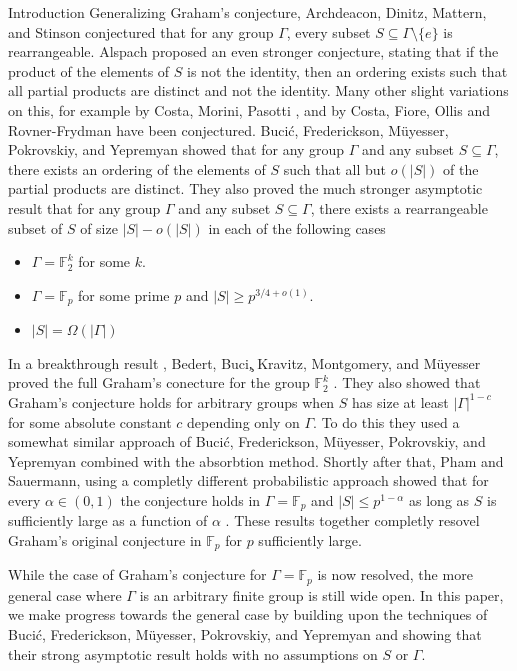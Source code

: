 \documentclass[11pt,a4paper]{article}
\begin{document}
\begin{section}{Introduction}
Generalizing Graham's conjecture, Archdeacon, Dinitz, Mattern, and Stinson \cite{ADMS} conjectured that for any group $\Gamma$, every subset $S \subseteq \Gamma \setminus \{e \}$ is rearrangeable. Alspach \cite{Al} proposed an even stronger conjecture, stating that if the product of the elements of $S$ is not the identity, then an ordering exists such that all partial products are distinct and not the identity. Many other slight variations on this, for example by Costa, Morini, Pasotti \cite{CMPP}, and by Costa, Fiore, Ollis and Rovner-Frydman \cite{CDFO} have been conjectured. Buci\'c, Frederickson, M\"uyesser, Pokrovskiy, and Yepremyan \cite{BFMPY} showed that for any group $\Gamma$ and any subset $S \subseteq \Gamma$, there exists an ordering of the elements of $S$ such that all but $o(|S|)$ of the partial products are distinct. They also proved the much stronger asymptotic result that for any group $\Gamma$ and any subset $S \subseteq \Gamma$, there exists a rearrangeable subset of $S$ of size $|S| - o(|S|)$ in each of the following cases
\begin{itemize}
\item $\Gamma = \mathbb F_2^k$ for some $k$.
\item $\Gamma = \mathbb F_p$ for some prime $p$ and $|S| \geq p^{3/4 + o(1)}$.
\item $|S| = \Omega(|\Gamma|)$
\end{itemize}
 In a breakthrough result \cite{BBK}, Bedert, Buci\c, Kravitz, Montgomery, and M\"uyesser proved the full Graham's conecture for the group $\mathbb{F}^k_2$ \cite{BBK}. They also showed that Graham's conjecture holds for arbitrary groups when $S$ has size at least $|\Gamma|^{1- c}$ for some absolute constant $c$ depending only on $\Gamma$. To do this they used a somewhat similar approach of Buci\'c, Frederickson, M\"uyesser, Pokrovskiy, and Yepremyan \cite{BFMPY} combined with the absorbtion method. Shortly after that, Pham and Sauermann, using a completly different probabilistic approach showed that for every $\alpha \in (0, 1)$ the conjecture holds in $\Gamma = \mathbb{F}_p$ and $|S| \leq p^{1 - \alpha}$ as long as $S$ is sufficiently large as a function of $\alpha$ \cite{PS}. These results together completly resovel Graham's original conjecture in $\mathbb{F}_p$ for $p$ sufficiently large. 

\medskip

While the case of Graham's conjecture for $\Gamma = \mathbb{F}_p$ is now resolved, the more general case where $\Gamma$ is an arbitrary finite group is still wide open. In this paper, we make progress towards the general case by building upon the techniques of Buci\'c, 
Frederickson, M\"uyesser, Pokrovskiy, and Yepremyan and showing that their strong asymptotic result holds with no assumptions on $S$ or $\Gamma$.


\end{section}
\end{document}
